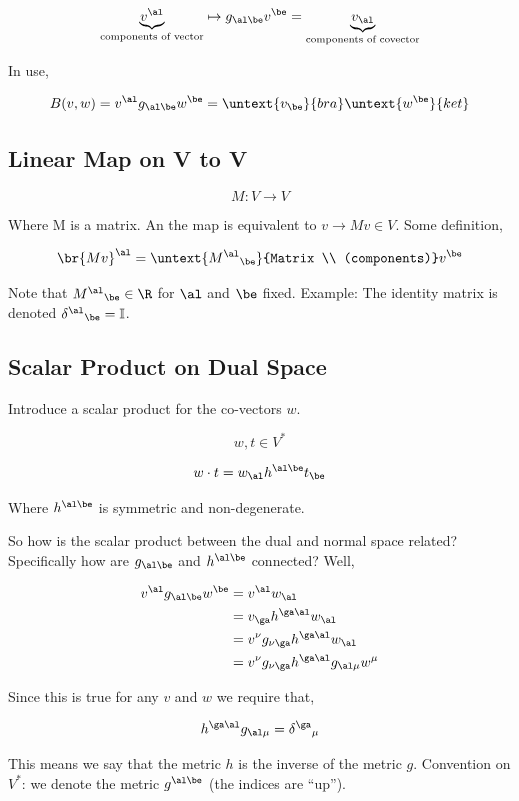 \documentclass{article}
\begin{document}
\[ \underbrace{v^\al}_{\text{components of vector}} \mapsto g_{\al\be} v^\be = \underbrace{v_\al}_{\text{components of covector}} \]

In use,

\[ B(v,w) = v^\al g_{\al\be} w^\be = \untext{v_\be}{bra} \untext{w^\be}{ket} \]

\subsection{Linear Map on V to V}

\[ M : V \to V \]

Where M is a matrix. An the map is equivalent to $v \to Mv \in V$. Some definition,

\[ \br{Mv}^\al = \untext{{M^\al}_\be}{Matrix \\ (components)} v^\be \]

Note that ${M^\al}_\be \in \R$ for $\al$ and $\be$ fixed. Example: The identity matrix is denoted ${\delta^\al}_\be = \mathbb{I}$.

\subsection{Scalar Product on Dual Space}

Introduce a scalar product for the co-vectors $w$.

\[ w, t \in V^* \]

\[ w \cdot t = w_\al h^{\al\be} t_\be \]

Where $h^{\al\be}$ is symmetric and non-degenerate.

So how is the scalar product between the dual and normal space related? Specifically how are $g_{\al\be}$ and $h^{\al\be}$ connected? Well,

\begin{align*}
   v^\al g_{\al\be} w^\be &= v^\al w_\al \\
   &= v_\ga h^{\ga\al} w_\al \\
   &= v^\nu g_{\nu\ga} h^{\ga\al} w_\al \\
   &= v^\nu g_{\nu\ga} h^{\ga\al} g_{\al\mu} w^\mu
\end{align*}

Since this is true for any $v$ and $w$ we require that,

\[ h^{\ga\al} g_{\al\mu} = {\delta^\ga}_\mu \]

This means we say that the metric $h$ is the inverse of the metric $g$. Convention on $V^*$: we denote the metric $g^{\al\be}$ (the indices are ``up''). \\
\end{document}
